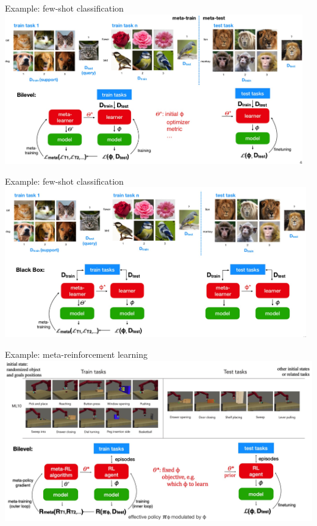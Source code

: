 \begin{frame}{Example: few-shot classification}
    \centering\includegraphics[height=6.5cm]{image/img003052.jpg}
\end{frame}

\begin{frame}{Example: few-shot classification}
    \centering\includegraphics[height=6.5cm]{image/img003340.jpg}
\end{frame}

\begin{frame}{Example: meta-reinforcement learning}
    \centering\includegraphics[height=7cm]{image/img003718.jpg}
\end{frame}

